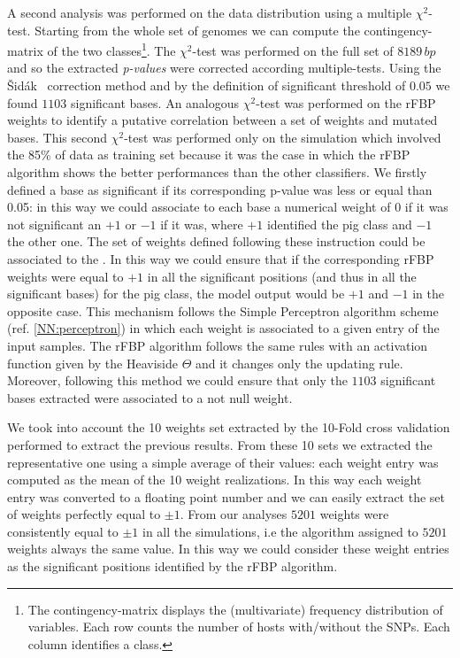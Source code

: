 \documentclass{standalone}
\begin{document}
A second analysis was performed on the data distribution using a multiple $\chi^2$-test.
Starting from the whole set of genomes we can compute the contingency-matrix of the two classes\footnote{
  The contingency-matrix displays the (multivariate) frequency distribution of variables.
  Each row counts the number of hosts with/without the SNPs.
  Each column identifies a class.
}.
The $\chi^2$-test was performed on the full set of $8189\,bp$ and so the extracted \emph{p-values} were corrected according multiple-tests.
Using the \v{S}id\'ak~\cite{Sidak1967} correction method and by the definition of significant threshold of $0.05$ we found $1103$ significant bases.
An analogous $\chi^2$-test was performed on the rFBP weights to identify a putative correlation between a set of weights and mutated bases.
This second $\chi^2$-test was performed only on the simulation which involved the 85\% of data as training set because it was the case in which the rFBP algorithm shows the better performances than the other classifiers.
We firstly defined a base as significant if its corresponding p-value was less or equal than 0.05: in this way we could associate to each base a numerical weight of 0 if it was not significant an $+1$ or $-1$ if it was, where $+1$ identified the pig class and $-1$ the other one.
The set of weights defined following these instruction could be associated to the .
In this way we could ensure that if the corresponding rFBP weights were equal to $+1$ in all the significant positions (and thus in all the significant bases) for the pig class, the model output would be $+1$ and $-1$ in the opposite case.
This mechanism follows the Simple Perceptron algorithm scheme (ref. \ref{NN:perceptron}) in which each weight is associated to a given entry of the input samples.
The rFBP algorithm follows the same rules with an activation function given by the Heaviside $\Theta$ and it changes only the updating rule.
Moreover, following this method we could ensure that only the $1103$ significant bases extracted were associated to a not null weight.

We took into account the 10 weights set extracted by the 10-Fold cross validation performed to extract the previous results.
From these 10 sets we extracted the representative one using a simple average of their values: each weight entry was computed as the mean of the 10 weight realizations.
In this way each weight entry was converted to a floating point number and we can easily extract the set of weights perfectly equal to $\pm1$.
From our analyses $5201$ weights were consistently equal to $\pm1$ in all the simulations, i.e the algorithm assigned to $5201$ weights always the same value.
In this way we could consider these weight entries as the significant positions identified by the rFBP algorithm.
\end{document}
